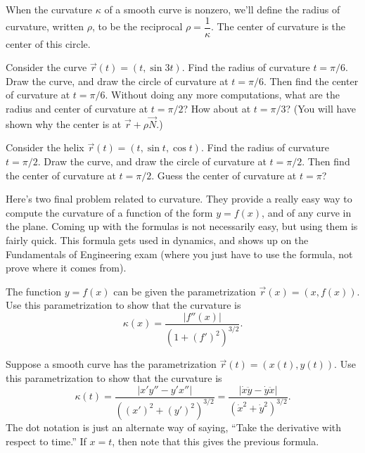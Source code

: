 \begin{definition}%
When the curvature $\kappa$ of a smooth curve is nonzero, we'll define the radius of curvature, written $\rho$, to be the reciprocal $\rho = \dfrac{1}{\kappa}$. The center of curvature is the center of this circle.
\end{definition}

\begin{problem}
 Consider the curve $\vec r(t)=(t,\sin 3 t)$. Find the radius of curvature $t=\pi/6$. Draw the curve, and draw the circle of curvature at $t=\pi/6$. Then find the center of curvature at $t=\pi/6$. Without doing any more computations, what are the radius and center of curvature at $t=\pi/2$?  How about at $t=\pi/3$? (You will have shown why the center is at $\vec r + \rho \vec N$.)
\end{problem}

\begin{problem}
 Consider the helix $\vec r(t)=(t,\sin t,\cos t)$. Find the radius of curvature $t=\pi/2$. Draw the curve, and draw the circle of curvature at $t=\pi/2$. Then find the center of curvature at $t=\pi/2$. Guess the center of curvature at $t=\pi$?
\end{problem}

Here's two final problem related to curvature.  They provide a really easy way to compute the curvature of a function of the form $y=f(x)$, and of any curve in the plane. Coming up with the formulas is not necessarily easy, but using them is fairly quick. This formula gets used in dynamics, and shows up on the Fundamentals of Engineering exam (where you just have to use the formula, not prove where it comes from).
\begin{problem}
%
 The function $y=f(x)$ can be given the parametrization  $\vec r(x) = (x,f(x))$.  Use this parametrization to show that the curvature is $$\kappa(x) = \frac{|f''(x)|}{(1+(f')^2)^{3/2}}.$$
\end{problem}

\begin{problem}[Optional]
%
 Suppose a smooth curve has the parametrization $\vec r(t) = (x(t),y(t))$.  Use this parametrization to show that the curvature is $$\kappa(t) = \frac{|x'y''-y'x''|}{((x')^2+(y')^2)^{3/2}} = \frac{|\dot{x} \ddot{y}-\dot{y} \ddot{x}|}{(\dot{x}^2+\dot {y}^2)^{3/2}} .$$ The dot notation is just an alternate way of saying, ``Take the derivative with respect to time.'' If $x=t$, then note that this gives the previous formula.
\end{problem}


